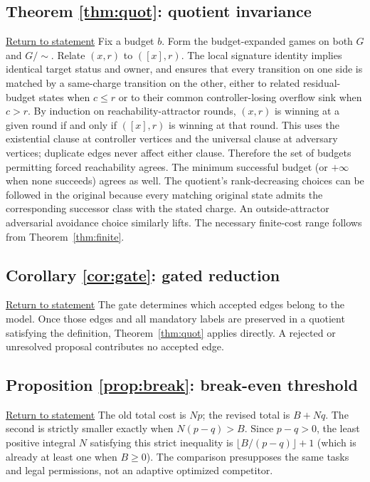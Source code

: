 \documentclass[11pt,letterpaper]{article}
\theoremstyle{definition}
\theoremstyle{remark}
\newcommand{\backstatement}[1]{\hyperlink{stmt:#1}{\footnotesize Return to statement}}
\begin{document}
\hypertarget{proof:quot}{}\subsection*{Theorem \ref{thm:quot}: quotient invariance} \backstatement{quot}
Fix a budget $b$. Form the budget-expanded games on both $G$ and $G/{\sim}$. Relate $(x,r)$ to $([x],r)$. The local signature identity implies identical target status and owner, and ensures that every transition on one side is matched by a same-charge transition on the other, either to related residual-budget states when $c\le r$ or to their common controller-losing overflow sink when $c>r$. By induction on reachability-attractor rounds, $(x,r)$ is winning at a given round if and only if $([x],r)$ is winning at that round. This uses the existential clause at controller vertices and the universal clause at adversary vertices; duplicate edges never affect either clause. Therefore the set of budgets permitting forced reachability agrees. The minimum successful budget (or $+\infty$ when none succeeds) agrees as well. The quotient's rank-decreasing choices can be followed in the original because every matching original state admits the corresponding successor class with the stated charge. An outside-attractor adversarial avoidance choice similarly lifts. The necessary finite-cost range follows from Theorem~\ref{thm:finite}.

\hypertarget{proof:gate}{}\subsection*{Corollary \ref{cor:gate}: gated reduction} \backstatement{gate}
The gate determines which accepted edges belong to the model. Once those edges and all mandatory labels are preserved in a quotient satisfying the definition, Theorem~\ref{thm:quot} applies directly. A rejected or unresolved proposal contributes no accepted edge.

\hypertarget{proof:break}{}\subsection*{Proposition \ref{prop:break}: break-even threshold} \backstatement{break}
The old total cost is $Np$; the revised total is $B+Nq$. The second is strictly smaller exactly when $N(p-q)>B$. Since $p-q>0$, the least positive integral $N$ satisfying this strict inequality is $\lfloor B/(p-q)\rfloor+1$ (which is already at least one when $B\ge0$). The comparison presupposes the same tasks and legal permissions, not an adaptive optimized competitor.
\end{document}
